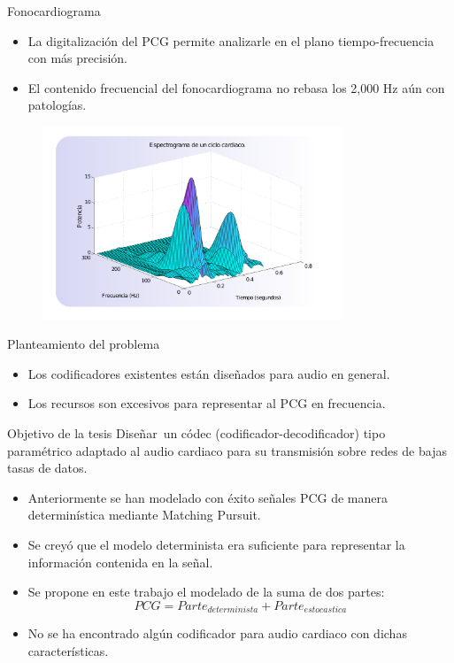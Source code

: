 \documentclass[xcolor=table]{beamer}
\begin{document}
\begin{frame}{Fonocardiograma}
	\begin{itemize}
		\item<2-> La digitalizaci\'on del PCG permite analizarle en el plano tiempo-frecuencia con m\'as precisi\'on.
		\item<3-> El contenido frecuencial del fonocardiograma no rebasa los 2,000 Hz a\'un con patolog\'ias.
	\end{itemize}\pause
	\begin{figure}
		\centering
		\includegraphics[width=0.8\textwidth]{spectrogram_PCG.pdf}
	\end{figure}
\end{frame}

\begin{frame}{Planteamiento del problema}
	\begin{itemize}
		\item<2-> Los codificadores existentes est\'an dise\~nados para audio en general. 
		\item<3-> Los recursos son excesivos para representar al PCG en frecuencia. 
	\end{itemize}\pause
	\begin{exampleblock}{Objetivo de la tesis}
		Dise\~nar\ un c\'odec (codificador-decodificador) tipo param\'etrico adaptado al audio cardiaco para su transmisi\'on sobre redes de bajas tasas de datos. 			
	\end{exampleblock}
\end{frame}

\begin{frame}
	\begin{itemize}
		\item<2-> Anteriormente se han modelado con \'exito se\~nales PCG de manera determin\'istica mediante Matching Pursuit.
		\item<3-> Se crey\'o que el modelo determinista era suficiente para representar la informaci\'on contenida en la se\~nal.
		\item<4-> Se propone en este trabajo el modelado de la suma de dos partes:
					$$
						 PCG= Parte_{determinista} + Parte_{estocastica}$$									
					
		\item<5-> No se ha encontrado alg\'un codificador para audio cardiaco con dichas caracter\'isticas.
	\end{itemize}
\end{frame}
\end{document}
